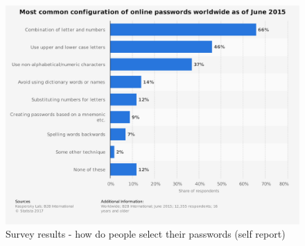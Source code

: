 
\begin{figure}[htbp]
	\centering
	\includegraphics[width=0.6\linewidth]{../statista/statistic_id463406_typical-configuration-of-internet-passwords-2015}
	\caption{ Survey results - how do people select their passwords (self report)}
\end{figure}
	
